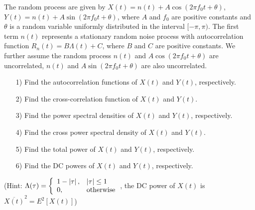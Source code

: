 \documentclass{assignment}
\begin{document}
\begin{prob}
    The random process are given by $X(t)=n(t)+A\cos(2\pi f_0t+\theta)$, $Y(t)=n(t)+A\sin(2\pi f_0t+\theta)$, where $A$ and $f_0$ are positive constants and $\theta$ is a random variable uniformly distributed in the interval $[-\pi,\pi)$. The first term $n(t)$ represents a stationary random noise process with autocorrelation function $R_n(t)=B\Lambda(t)+C$, where $B$ and $C$ are positive constants. We further assume the random process $n(t)$ and $A\cos(2\pi f_0t+\theta)$ are uncorrelated, $n(t)$ and $A\sin(2\pi f_0t+\theta)$ are also uncorrelated.
    \begin{itemize}
        \item[1)] Find the autocorrelation functions of $X(t)$ and $Y(t)$, respectively.
        \item[2)] Find the cross-correlation function of $X(t)$ and $Y(t)$.
        \item[3)] Find the power spectral densities of $X(t)$ and $Y(t)$, respectively.
        \item[4)] Find the cross power spectral density of $X(t)$ and $Y(t)$.
        \item[5)] Find the total power of $X(t)$ and $Y(t)$, respectively.
        \item[6)] Find the DC powers of $X(t)$ and $Y(t)$, respectively.
    \end{itemize}
    (Hint: $\Lambda(\tau)=\left\{\begin{array}{ll}
        1-\left\lvert\tau\right\rvert,&\left\lvert\tau\right\rvert\leq 1\\
        0,&\text{otherwise}
    \end{array}\right.$, the DC power of $X(t)$ is $\overline{X(t)}^2=E^2[X(t)]$)
\end{prob}
\begin{sol}

\end{sol}
\end{document}
